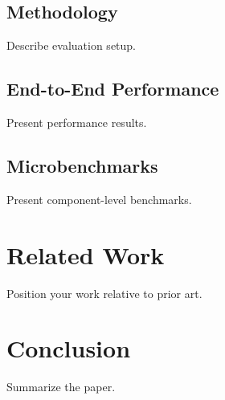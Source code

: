\documentclass[sigconf,review]{acmart}
\begin{document}
\subsection{Methodology}
Describe evaluation setup.

\subsection{End-to-End Performance}
Present performance results.

\subsection{Microbenchmarks}
Present component-level benchmarks.

\section{Related Work}
Position your work relative to prior art.

\section{Conclusion}
Summarize the paper.



\end{document}
